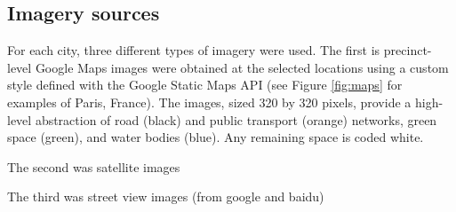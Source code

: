 \documentclass[final,3p,times,authoryear]{elsarticle}
\begin{document}
\subsection{Imagery sources}\label{sec:methods3}

For each city, three different types of imagery were used. The first is precinct-level Google Maps images were obtained at the selected locations using a custom style defined with the Google Static Maps API (see Figure \ref{fig:maps} for examples of Paris, France). The images, sized 320 by 320 pixels, provide a high-level abstraction of road (black) and public transport (orange) networks, green space (green), and water bodies (blue). Any remaining space is coded white.

The second was satellite images

The third was street view images (from google and baidu)

     
 
\end{document}
